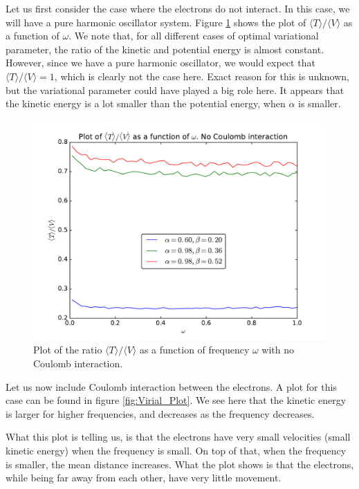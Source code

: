 \documentclass[12pt]{article}
\begin{document}
Let us first consider the case where the electrons do not interact. In this case, we will have a pure harmonic oscillator system. Figure \ref{fig:Virial_NoCoulomb} shows the plot of $\langle T \rangle / \langle V \rangle$ as a function of $\omega$. We note that, for all different cases of optimal variational parameter, the ratio of the kinetic and potential energy is almost constant. However, since we have a pure harmonic oscillator, we would expect that $\langle T \rangle / \langle V \rangle = 1$, which is clearly not the case here. Exact reason for this is unknown, but the variational parameter could have played a big role here. It appears that the kinetic energy is a lot smaller than the potential energy, when $\alpha$ is smaller.
\begin{figure}[h]
\centering
\includegraphics[width=\linewidth]{Plots/Virial_Plot_NoCoulombInt.pdf}
\caption{Plot of the ratio $\langle T \rangle / \langle V \rangle$ as a function of frequency $\omega$ with no Coulomb interaction.}
\label{fig:Virial_NoCoulomb}
\end{figure}


Let us now include Coulomb interaction between the electrons. A plot for this case can be found in figure \ref{fig:Virial_Plot}. We see here that the kinetic energy is larger for higher frequencies, and decreases as the frequency decreases. 

What this plot is telling us, is that the electrons have very small velocities (small kinetic energy) when the frequency is small. On top of that, when the frequency is smaller, the mean distance increases. What the plot shows is that the electrons, while being far away from each other, have very little movement. 
\end{document}
